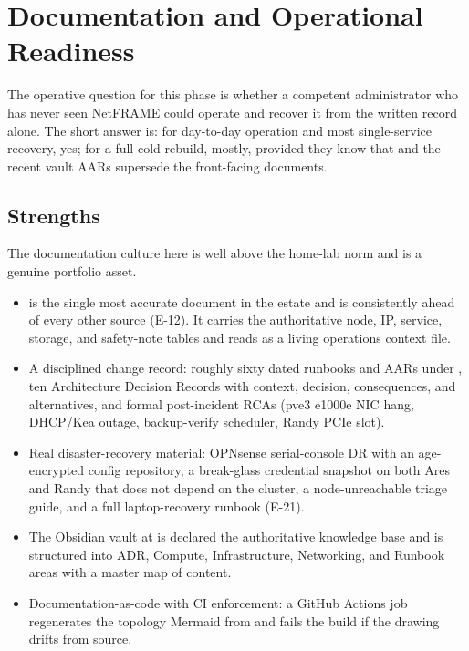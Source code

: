 \section{Documentation and Operational Readiness}\label{sec:documentation}

The operative question for this phase is whether a competent administrator who has never seen NetFRAME could operate and recover it from the written record alone. The short answer is: for day-to-day operation and most single-service recovery, yes; for a full cold rebuild, mostly, provided they know that  and the recent vault AARs supersede the front-facing documents.

\subsection{Strengths}

The documentation culture here is well above the home-lab norm and is a genuine portfolio asset.

\begin{itemize}
  \item {} is the single most accurate document in the estate and is consistently ahead of every other source (E-12). It carries the authoritative node, IP, service, storage, and safety-note tables and reads as a living operations context file.
  \item A disciplined change record: roughly sixty dated runbooks and AARs under , ten Architecture Decision Records with context, decision, consequences, and alternatives, and formal post-incident RCAs (pve3 e1000e NIC hang, DHCP/Kea outage, backup-verify scheduler, Randy PCIe slot).
  \item Real disaster-recovery material: OPNsense serial-console DR with an age-encrypted config repository, a break-glass credential snapshot on both Ares and Randy that does not depend on the cluster, a node-unreachable triage guide, and a full laptop-recovery runbook (E-21).
  \item The Obsidian vault at  is declared the authoritative knowledge base and is structured into ADR, Compute, Infrastructure, Networking, and Runbook areas with a master map of content.
  \item Documentation-as-code with CI enforcement: a GitHub Actions job regenerates the topology Mermaid from  and fails the build if the drawing drifts from source.
\end{itemize}

